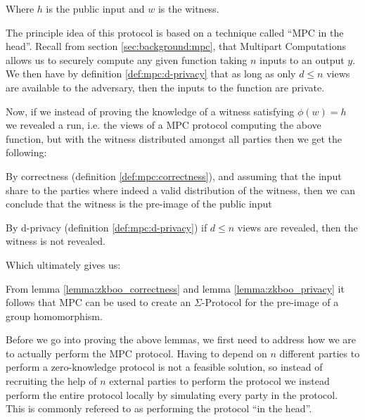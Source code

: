 Where $h$ is the public input and $w$ is the witness.


The principle idea of this protocol is based on a technique called ``MPC in the
head''. Recall from section \ref{sec:background:mpc}, that
Multipart Computations allows us to securely compute any given function taking
$n$ inputs to an output $y$.
We then have by definition \ref{def:mpc:d-privacy} that as long as only
$d \leq n$ views are available to the adversary, then the inputs to the function
are private.

Now, if we instead of proving the knowledge of a witness satisfying $\phi(w) = h$
we revealed a run, i.e. the views of a MPC protocol computing the above
function, but with the witness distributed amongst all parties then we get the
following:

\begin{lemma}
\label{lemma:zkboo_correctness}
By correctness (definition \ref{def:mpc:correctness}), and assuming that
the input share to the parties where indeed a valid distribution of the
witness, then we can conclude that the witness is the pre-image of the public input
\end{lemma}

\begin{lemma}
\label{lemma:zkboo_privacy}
By d-privacy (definition \ref{def:mpc:d-privacy}) if $d \leq n$ views are
revealed, then the witness is not revealed.
\end{lemma}

Which ultimately gives us:

\begin{lemma}
\label{lemma:zkboo_secure}
From lemma \ref{lemma:zkboo_correctness} and lemma \ref{lemma:zkboo_privacy} it
follows that MPC can be used to create an $\Sigma$-Protocol for the
pre-image of a group homomorphism.
\end{lemma}

Before we go into proving the above lemmas, we first need to address how we are
to actually perform the MPC protocol. Having to depend on $n$ different parties
to perform a zero-knowledge protocol is not a feasible solution, so instead of
recruiting the help of $n$ external parties to perform the protocol we instead
perform the entire protocol locally by simulating every party in the protocol.
This is commonly refereed to as performing the protocol ``in the head''.


